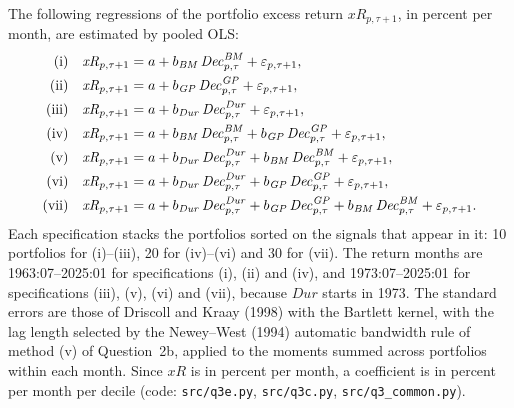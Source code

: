 \documentclass[11pt]{article}
\newcommand{\xR}{\mathit{xR}}
\newcommand{\BM}{\mathit{BM}}
\newcommand{\GP}{\mathit{GP}}
\newcommand{\Dur}{\mathit{Dur}}
\begin{document}
The following regressions of the portfolio excess return $\xR_{p,\tau+1}$, in percent per
month, are estimated by pooled OLS:
\begin{align}
  \text{(i)}\quad   & \xR_{p,\tau+1} = a + b_{\BM}\, \mathit{Dec}^{\BM}_{p,\tau} + \varepsilon_{p,\tau+1}, \notag\\
  \text{(ii)}\quad  & \xR_{p,\tau+1} = a + b_{\GP}\, \mathit{Dec}^{\GP}_{p,\tau} + \varepsilon_{p,\tau+1}, \notag\\
  \text{(iii)}\quad & \xR_{p,\tau+1} = a + b_{\Dur}\, \mathit{Dec}^{\Dur}_{p,\tau} + \varepsilon_{p,\tau+1}, \notag\\
  \text{(iv)}\quad  & \xR_{p,\tau+1} = a + b_{\BM}\, \mathit{Dec}^{\BM}_{p,\tau}
                      + b_{\GP}\, \mathit{Dec}^{\GP}_{p,\tau} + \varepsilon_{p,\tau+1}, \label{eq:q3e_regressions}\\
  \text{(v)}\quad   & \xR_{p,\tau+1} = a + b_{\Dur}\, \mathit{Dec}^{\Dur}_{p,\tau}
                      + b_{\BM}\, \mathit{Dec}^{\BM}_{p,\tau} + \varepsilon_{p,\tau+1}, \notag\\
  \text{(vi)}\quad  & \xR_{p,\tau+1} = a + b_{\Dur}\, \mathit{Dec}^{\Dur}_{p,\tau}
                      + b_{\GP}\, \mathit{Dec}^{\GP}_{p,\tau} + \varepsilon_{p,\tau+1}, \notag\\
  \text{(vii)}\quad & \xR_{p,\tau+1} = a + b_{\Dur}\, \mathit{Dec}^{\Dur}_{p,\tau}
                      + b_{\GP}\, \mathit{Dec}^{\GP}_{p,\tau} + b_{\BM}\, \mathit{Dec}^{\BM}_{p,\tau}
                      + \varepsilon_{p,\tau+1}. \notag
\end{align}
Each specification stacks the portfolios sorted on the signals that appear in it: 10
portfolios for (i)--(iii), 20 for (iv)--(vi) and 30 for (vii). The return months are
1963:07--2025:01 for specifications (i), (ii) and (iv), and 1973:07--2025:01 for
specifications (iii), (v), (vi) and (vii), because $\Dur$ starts in 1973. The standard errors
are those of Driscoll and Kraay (1998) with the Bartlett kernel, with the lag length selected
by the Newey--West (1994) automatic bandwidth rule of method (v) of Question~2b, applied to
the moments summed across portfolios within each month. Since $\xR$ is in percent per month,
a coefficient is in percent per month per decile (code: \texttt{src/q3e.py},
\texttt{src/q3c.py}, \texttt{src/q3\_common.py}).

\begin{table}[H]
  \centering
  
  \caption{Pooled OLS estimates of regressions (\ref{eq:q3e_regressions}) for value-weighted
  and equal-weighted decile portfolios (annual rebalancing, NYSE breakpoints), in percent per
  month per decile, with Driscoll--Kraay (1998) $t$-statistics in brackets (Bartlett kernel,
  between 1 and 11 lags).}
  \label{tab:q3e}
\end{table}
\end{document}

